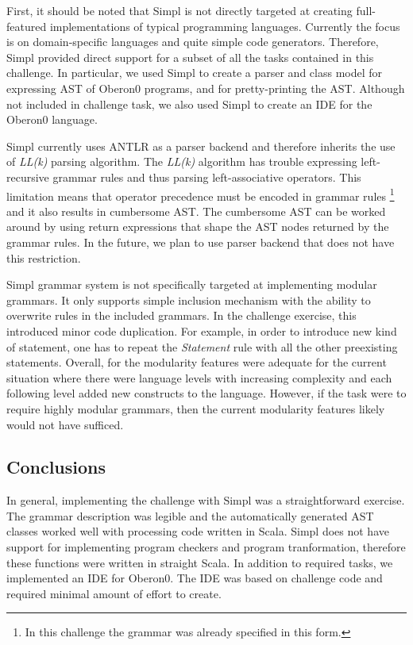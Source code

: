 First, it should be noted that Simpl is not directly targeted at creating
full-featured implementations of typical programming languages. Currently
the focus is on domain-specific languages and quite simple code generators.
Therefore, Simpl provided direct support for a subset of all the tasks
contained in this challenge. In particular, we used Simpl to create
a parser and class model for expressing AST of Oberon0 programs, and
for pretty-printing the AST. Although not included in challenge task,
we also used Simpl to create an IDE for the Oberon0 language.

Simpl currently uses ANTLR as a parser backend and therefore inherits
the use of \emph{LL(k)} parsing algorithm. The \emph{LL(k)} algorithm
has trouble expressing left-recursive grammar rules and thus parsing
left-associative operators. This limitation means that operator precedence
must be encoded in grammar rules%
\footnote{In this challenge the grammar was already specified in this form.%
} and it also results in cumbersome AST. The cumbersome AST can be
worked around by using return expressions that shape the AST nodes
returned by the grammar rules. In the future, we plan to use parser
backend that does not have this restriction.

Simpl grammar system is not specifically targeted at implementing
modular grammars. It only supports simple inclusion mechanism with
the ability to overwrite rules in the included grammars. In the challenge
exercise, this introduced minor code duplication. For example, in
order to introduce new kind of statement, one has to repeat the \emph{Statement}
rule with all the other preexisting statements. Overall, for the modularity
features were adequate for the current situation where there were
language levels with increasing complexity and each following level
added new constructs to the language. However, if the task were to
require highly modular grammars, then the current modularity features
likely would not have sufficed.


\subsection{Conclusions}

In general, implementing the challenge with Simpl was a straightforward
exercise. The grammar description was legible and the automatically
generated AST classes worked well with processing code written in
Scala. Simpl does not have support for implementing program checkers
and program tranformation, therefore these functions were written
in straight Scala. In addition to required tasks, we implemented an
IDE for Oberon0. The IDE was based on challenge code and required
minimal amount of effort to create.

